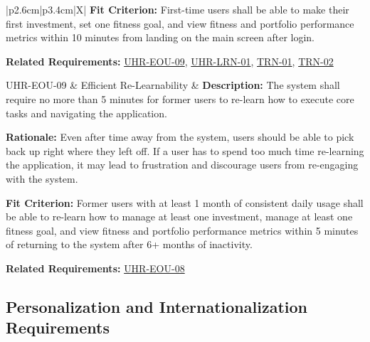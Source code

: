 \documentclass[12pt]{article}
\begin{document}
\begin{xltabular}{\textwidth}{|p{2.6cm}|p{3.4cm}|X|}
\textbf{Fit Criterion:} First-time users shall be able to make their first investment, set one fitness goal, and view fitness and portfolio performance metrics within 10 minutes from landing on the main screen after login.

\textbf{Related Requirements:} \hyperlink{req:UHR-EOU-09}{UHR-EOU-09}, \hyperlink{req:UHR-LRN-01}{UHR-LRN-01}, \hyperlink{req:TRN-01}{TRN-01}, \hyperlink{req:TRN-02}{TRN-02}\\
\hline

UHR-EOU-09\hypertarget{req:UHR-EOU-09}{} & 
Efficient Re-Learnability & 
\textbf{Description:} The system shall require no more than 5 minutes for former users to re-learn how to execute core tasks and navigating the application. 

\textbf{Rationale:} Even after time away from the system, users should be able to pick back up right where they left off. If a user has to spend too much time re-learning the application, it may lead to frustration and discourage users from re-engaging with the system.

\textbf{Fit Criterion:} Former users with at least 1 month of consistent daily usage shall be able to re-learn how to manage at least one investment, manage at least one fitness goal, and view fitness and portfolio performance metrics within 5 minutes of returning to the system after 6+ months of inactivity.

\textbf{Related Requirements:} \hyperlink{req:UHR-EOU-08}{UHR-EOU-08}\\
\hline

\end{xltabular}

\subsection{Personalization and Internationalization Requirements}
\end{document}
